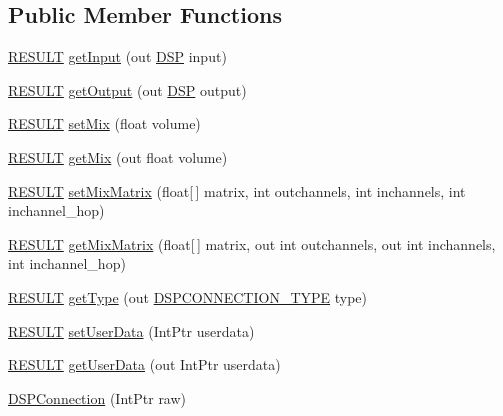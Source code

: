 \subsection*{Public Member Functions}
\begin{DoxyCompactItemize}
\item 
\hyperlink{namespace_f_m_o_d_a305d1176ef3f8c8815861a60407ac33d}{R\+E\+S\+U\+LT} \hyperlink{class_f_m_o_d_1_1_d_s_p_connection_a8c5c863bba5e01ca67f5269b2d97c3a9}{get\+Input} (out \hyperlink{class_f_m_o_d_1_1_d_s_p}{D\+SP} input)
\item 
\hyperlink{namespace_f_m_o_d_a305d1176ef3f8c8815861a60407ac33d}{R\+E\+S\+U\+LT} \hyperlink{class_f_m_o_d_1_1_d_s_p_connection_ae9ffe554de56860006e2f8e16f101de9}{get\+Output} (out \hyperlink{class_f_m_o_d_1_1_d_s_p}{D\+SP} output)
\item 
\hyperlink{namespace_f_m_o_d_a305d1176ef3f8c8815861a60407ac33d}{R\+E\+S\+U\+LT} \hyperlink{class_f_m_o_d_1_1_d_s_p_connection_af469a51fa09fad3cf0e76c4cbca74445}{set\+Mix} (float volume)
\item 
\hyperlink{namespace_f_m_o_d_a305d1176ef3f8c8815861a60407ac33d}{R\+E\+S\+U\+LT} \hyperlink{class_f_m_o_d_1_1_d_s_p_connection_a4eca6c02444348f52dde8838376a2ee3}{get\+Mix} (out float volume)
\item 
\hyperlink{namespace_f_m_o_d_a305d1176ef3f8c8815861a60407ac33d}{R\+E\+S\+U\+LT} \hyperlink{class_f_m_o_d_1_1_d_s_p_connection_a2babd2aea4604dbe5f18629f30629d12}{set\+Mix\+Matrix} (float\mbox{[}$\,$\mbox{]} matrix, int outchannels, int inchannels, int inchannel\+\_\+hop)
\item 
\hyperlink{namespace_f_m_o_d_a305d1176ef3f8c8815861a60407ac33d}{R\+E\+S\+U\+LT} \hyperlink{class_f_m_o_d_1_1_d_s_p_connection_ac6795f09bd1fff01d2226b2abb1fe267}{get\+Mix\+Matrix} (float\mbox{[}$\,$\mbox{]} matrix, out int outchannels, out int inchannels, int inchannel\+\_\+hop)
\item 
\hyperlink{namespace_f_m_o_d_a305d1176ef3f8c8815861a60407ac33d}{R\+E\+S\+U\+LT} \hyperlink{class_f_m_o_d_1_1_d_s_p_connection_ae144df4faa02c93a08ac36f34e569581}{get\+Type} (out \hyperlink{namespace_f_m_o_d_abd730a6ff8b969c2f90d4123deb42aca}{D\+S\+P\+C\+O\+N\+N\+E\+C\+T\+I\+O\+N\+\_\+\+T\+Y\+PE} type)
\item 
\hyperlink{namespace_f_m_o_d_a305d1176ef3f8c8815861a60407ac33d}{R\+E\+S\+U\+LT} \hyperlink{class_f_m_o_d_1_1_d_s_p_connection_a84925b868070185a7f996fb8950c38f9}{set\+User\+Data} (Int\+Ptr userdata)
\item 
\hyperlink{namespace_f_m_o_d_a305d1176ef3f8c8815861a60407ac33d}{R\+E\+S\+U\+LT} \hyperlink{class_f_m_o_d_1_1_d_s_p_connection_a0ba899f70bf4b962cf3f5fb0d63c6dac}{get\+User\+Data} (out Int\+Ptr userdata)
\item 
\hyperlink{class_f_m_o_d_1_1_d_s_p_connection_a29b71c3c0823f0f938f31a38192b8f4f}{D\+S\+P\+Connection} (Int\+Ptr raw)
\end{DoxyCompactItemize}
